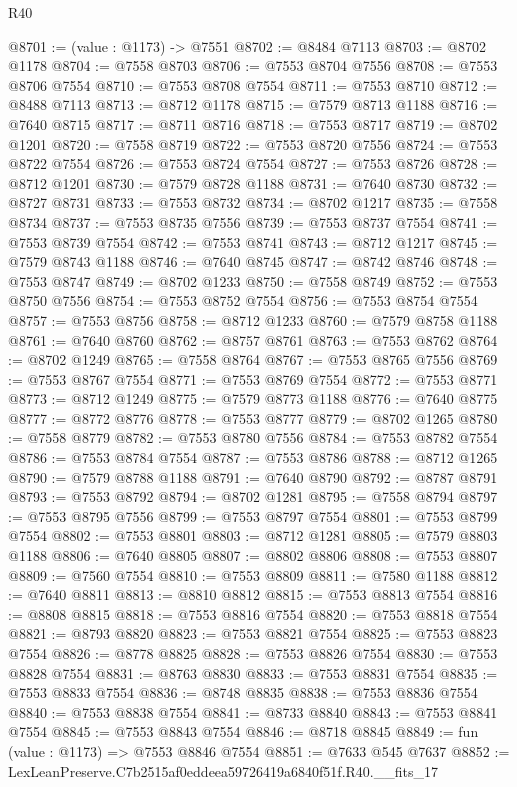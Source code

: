 \begin{lexlean}{R40}
\begin{coremodule}
@8701 := (value : @1173) -> @7551
@8702 := @8484 @7113
@8703 := @8702 @1178
@8704 := @7558 @8703
@8706 := @7553 @8704 @7556
@8708 := @7553 @8706 @7554
@8710 := @7553 @8708 @7554
@8711 := @7553 @8710
@8712 := @8488 @7113
@8713 := @8712 @1178
@8715 := @7579 @8713 @1188
@8716 := @7640 @8715
@8717 := @8711 @8716
@8718 := @7553 @8717
@8719 := @8702 @1201
@8720 := @7558 @8719
@8722 := @7553 @8720 @7556
@8724 := @7553 @8722 @7554
@8726 := @7553 @8724 @7554
@8727 := @7553 @8726
@8728 := @8712 @1201
@8730 := @7579 @8728 @1188
@8731 := @7640 @8730
@8732 := @8727 @8731
@8733 := @7553 @8732
@8734 := @8702 @1217
@8735 := @7558 @8734
@8737 := @7553 @8735 @7556
@8739 := @7553 @8737 @7554
@8741 := @7553 @8739 @7554
@8742 := @7553 @8741
@8743 := @8712 @1217
@8745 := @7579 @8743 @1188
@8746 := @7640 @8745
@8747 := @8742 @8746
@8748 := @7553 @8747
@8749 := @8702 @1233
@8750 := @7558 @8749
@8752 := @7553 @8750 @7556
@8754 := @7553 @8752 @7554
@8756 := @7553 @8754 @7554
@8757 := @7553 @8756
@8758 := @8712 @1233
@8760 := @7579 @8758 @1188
@8761 := @7640 @8760
@8762 := @8757 @8761
@8763 := @7553 @8762
@8764 := @8702 @1249
@8765 := @7558 @8764
@8767 := @7553 @8765 @7556
@8769 := @7553 @8767 @7554
@8771 := @7553 @8769 @7554
@8772 := @7553 @8771
@8773 := @8712 @1249
@8775 := @7579 @8773 @1188
@8776 := @7640 @8775
@8777 := @8772 @8776
@8778 := @7553 @8777
@8779 := @8702 @1265
@8780 := @7558 @8779
@8782 := @7553 @8780 @7556
@8784 := @7553 @8782 @7554
@8786 := @7553 @8784 @7554
@8787 := @7553 @8786
@8788 := @8712 @1265
@8790 := @7579 @8788 @1188
@8791 := @7640 @8790
@8792 := @8787 @8791
@8793 := @7553 @8792
@8794 := @8702 @1281
@8795 := @7558 @8794
@8797 := @7553 @8795 @7556
@8799 := @7553 @8797 @7554
@8801 := @7553 @8799 @7554
@8802 := @7553 @8801
@8803 := @8712 @1281
@8805 := @7579 @8803 @1188
@8806 := @7640 @8805
@8807 := @8802 @8806
@8808 := @7553 @8807
@8809 := @7560 @7554
@8810 := @7553 @8809
@8811 := @7580 @1188
@8812 := @7640 @8811
@8813 := @8810 @8812
@8815 := @7553 @8813 @7554
@8816 := @8808 @8815
@8818 := @7553 @8816 @7554
@8820 := @7553 @8818 @7554
@8821 := @8793 @8820
@8823 := @7553 @8821 @7554
@8825 := @7553 @8823 @7554
@8826 := @8778 @8825
@8828 := @7553 @8826 @7554
@8830 := @7553 @8828 @7554
@8831 := @8763 @8830
@8833 := @7553 @8831 @7554
@8835 := @7553 @8833 @7554
@8836 := @8748 @8835
@8838 := @7553 @8836 @7554
@8840 := @7553 @8838 @7554
@8841 := @8733 @8840
@8843 := @7553 @8841 @7554
@8845 := @7553 @8843 @7554
@8846 := @8718 @8845
@8849 := fun (value : @1173) => @7553 @8846 @7554
@8851 := @7633 @545 @7637
@8852 := LexLeanPreserve.C7b2515af0eddeea59726419a6840f51f.R40.__fits_17

\end{coremodule}
\end{lexlean}
